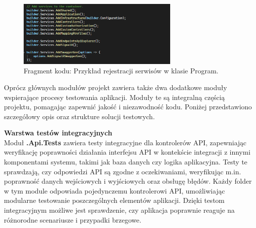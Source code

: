 \documentclass[12pt,a4paper]{article}
\begin{document}
\vspace{0.5cm}
\begin{figure}[h!]
    \centering
    \includegraphics[width=0.7\textwidth]{images/ex_add_services.png}
    \caption{Fragment kodu: Przykład rejestracji serwisów w klasie Program.}
\end{figure}
\vspace{0.5cm}

\noindent 
Oprócz głównych modułów projekt zawiera także dwa dodatkowe moduły wspierające procesy testowania aplikacji. Moduły te są integralną częścią projektu, pomagając zapewnić jakość i niezawodność kodu. Poniżej przedstawiono szczegółowy opis oraz strukture solucji testowych.

\newpage

\noindent \textbf{Warstwa testów integracyjnych}\\
Moduł \textbf{.Api.Tests} zawiera testy integracyjne dla kontrolerów API, zapewniając weryfikację poprawności działania interfejsu API w kontekście integracji z innymi komponentami systemu, takimi jak baza danych czy logika aplikacyjna. Testy te sprawdzają, czy odpowiedzi API są zgodne z oczekiwaniami, weryfikując m.in. poprawność danych wejściowych i wyjściowych oraz obsługę błędów. Każdy folder w tym module odpowiada pojedynczemu kontrolerowi API, umożliwiając modularne testowanie poszczególnych elementów aplikacji. Dzięki testom integracyjnym możliwe jest sprawdzenie, czy aplikacja poprawnie reaguje na różnorodne scenariusze i przypadki brzegowe.
\end{document}
